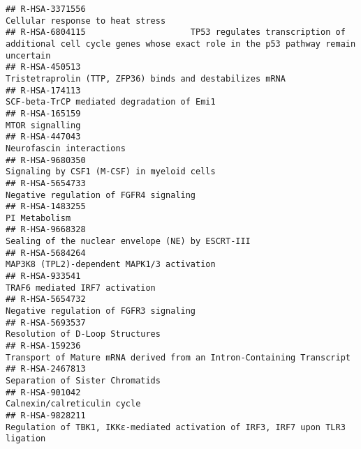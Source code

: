 \documentclass[
]{article}
\begin{document}
\begin{verbatim}
## R-HSA-3371556                                                                                                     Cellular response to heat stress
## R-HSA-6804115                     TP53 regulates transcription of additional cell cycle genes whose exact role in the p53 pathway remain uncertain
## R-HSA-450513                                                                              Tristetraprolin (TTP, ZFP36) binds and destabilizes mRNA
## R-HSA-174113                                                                                            SCF-beta-TrCP mediated degradation of Emi1
## R-HSA-165159                                                                                                                       MTOR signalling
## R-HSA-447043                                                                                                              Neurofascin interactions
## R-HSA-9680350                                                                                           Signaling by CSF1 (M-CSF) in myeloid cells
## R-HSA-5654733                                                                                               Negative regulation of FGFR4 signaling
## R-HSA-1483255                                                                                                                        PI Metabolism
## R-HSA-9668328                                                                                    Sealing of the nuclear envelope (NE) by ESCRT-III
## R-HSA-5684264                                                                                           MAP3K8 (TPL2)-dependent MAPK1/3 activation
## R-HSA-933541                                                                                                        TRAF6 mediated IRF7 activation
## R-HSA-5654732                                                                                               Negative regulation of FGFR3 signaling
## R-HSA-5693537                                                                                                      Resolution of D-Loop Structures
## R-HSA-159236                                                                 Transport of Mature mRNA derived from an Intron-Containing Transcript
## R-HSA-2467813                                                                                                      Separation of Sister Chromatids
## R-HSA-901042                                                                                                           Calnexin/calreticulin cycle
## R-HSA-9828211                                                        Regulation of TBK1, IKKε-mediated activation of IRF3, IRF7 upon TLR3 ligation

\end{verbatim}
\end{document}
